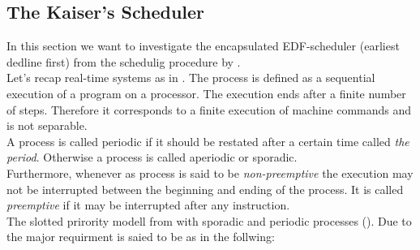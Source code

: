 \subsection{The Kaiser's Scheduler}









In this section we want to investigate the encapsulated EDF-scheduler (earliest dedline first) from the schedulig procedure by \cite{K}. \\

Let's recap \glspl{real-time system} as in \cite{KBK}.
The process is defined as a sequential execution of a program on a processor. The execution ends after a finite number of steps. 
Therefore it corresponds to a finite execution of machine commands and is not separable. \\
A process is called periodic if it should be restated after a certain time called {\itshape the period}. Otherwise a process is called aperiodic or sporadic.\\

Furthermore, whenever as process is said to be {\itshape non-preemptive} the execution may not be interrupted between the beginning and ending of the process. 
It is called {\itshape preemptive} if it may be interrupted after any instruction.\\  
 
The slotted prirority modell from \cite{B} with  sporadic and periodic processes (\cite{K}).
Due to \cite{B} the major requirment is saied to be as in the follwing:

